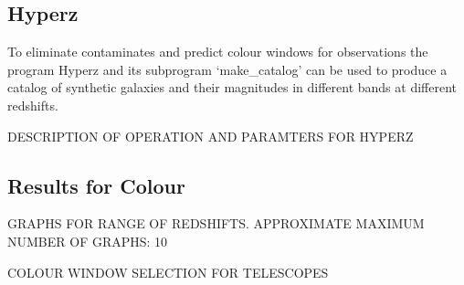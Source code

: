     \subsection{Hyperz} %
	\label{sub:Hyperz} 
		To eliminate contaminates and predict colour windows for observations the program Hyperz and its subprogram ‘make_catalog’ can be used to produce a catalog of synthetic galaxies and their magnitudes in different bands at different redshifts. 

		DESCRIPTION OF OPERATION AND PARAMTERS FOR HYPERZ


	\subsection{Results for Colour} %
	\label{sub:Results_for_Colour}
		GRAPHS FOR RANGE OF REDSHIFTS. APPROXIMATE MAXIMUM NUMBER OF GRAPHS: 10

		COLOUR WINDOW SELECTION FOR TELESCOPES

	
